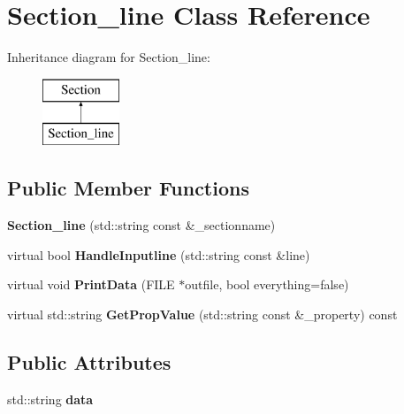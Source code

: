 \hypertarget{classSection__line}{\section{Section\-\_\-line Class Reference}
\label{classSection__line}
}
Inheritance diagram for Section\-\_\-line\-:\begin{figure}[H]
\begin{center}
\leavevmode
\includegraphics[height=2.000000cm]{classSection__line}
\end{center}
\end{figure}
\subsection*{Public Member Functions}
\begin{DoxyCompactItemize}
\item 
\hypertarget{classSection__line_ab79823a6ed5b8580e8f197d0c546de55}{{\bfseries Section\-\_\-line} (std\-::string const \&\-\_\-sectionname)}\label{classSection__line_ab79823a6ed5b8580e8f197d0c546de55}

\item 
\hypertarget{classSection__line_aacd8a65021f353eb6fc65c643937da9a}{virtual bool {\bfseries Handle\-Inputline} (std\-::string const \&line)}\label{classSection__line_aacd8a65021f353eb6fc65c643937da9a}

\item 
\hypertarget{classSection__line_abd95883a3bedd227be1d83abf8b17c4f}{virtual void {\bfseries Print\-Data} (F\-I\-L\-E $\ast$outfile, bool everything=false)}\label{classSection__line_abd95883a3bedd227be1d83abf8b17c4f}

\item 
\hypertarget{classSection__line_a774ec5244efc9541ab913762af8c9cf3}{virtual std\-::string {\bfseries Get\-Prop\-Value} (std\-::string const \&\-\_\-property) const }\label{classSection__line_a774ec5244efc9541ab913762af8c9cf3}

\end{DoxyCompactItemize}
\subsection*{Public Attributes}
\begin{DoxyCompactItemize}
\item 
\hypertarget{classSection__line_a9a389941bb8990829a82fb8b41a06b70}{std\-::string {\bfseries data}}\label{classSection__line_a9a389941bb8990829a82fb8b41a06b70}

\end{DoxyCompactItemize}


